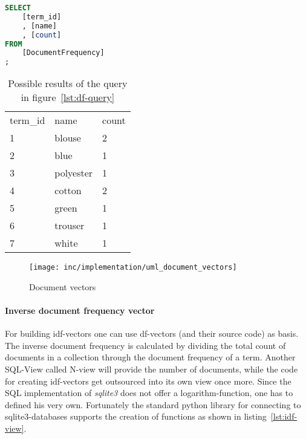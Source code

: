 \begin{lstlisting}[language=SQL,caption={SQL query for generating df-vectors},label={lst:df-query},float=h]
SELECT
    [term_id]
    , [name]
    , [count]
FROM
    [DocumentFrequency]
;
\end{lstlisting}

\begin{table}
    \center
    \begin{tabular}{ l | l | l } 
        \rowcolor{\dustRowHead}
        \multicolumn{3}{ c }{\textbf{df}}\\\hline
        term\_id    & name      & count\\\hline
        1           & blouse    & 2\\
        2           & blue      & 1\\
        3           & polyester & 1\\
        4           & cotton    & 2\\
        5           & green     & 1\\
        6           & trouser   & 1\\
        7           & white     & 1\\
    \end{tabular}
    \caption{Possible results of the query in figure~\ref{lst:df-query}}
    \label{tab:df-query-result}
\end{table}

\begin{figure}[h]
    \center
    \texttt{[image: inc/implementation/uml\_document\_vectors]}
    \caption{Document vectors}
    \label{fig:uml-document-vectors}
\end{figure}

\paragraph{Inverse document frequency vector}
For building idf-vectors one can use df-vectors (and their source code) as basis.
The inverse document frequency is calculated by dividing the total count of documents in a collection through the document frequency of a term.
Another SQL-View called N-view will provide the number of documents, while the code for creating idf-vectors get outsourced into its own view once more.
Since the SQL implementation of \textit{sqlite3} does not offer a logarithm-function, one has to defined his very own.
Fortunately the standard python library for connecting to sqlite3-databases supports the creation of functions as shown in listing~\ref{lst:idf-view}.


